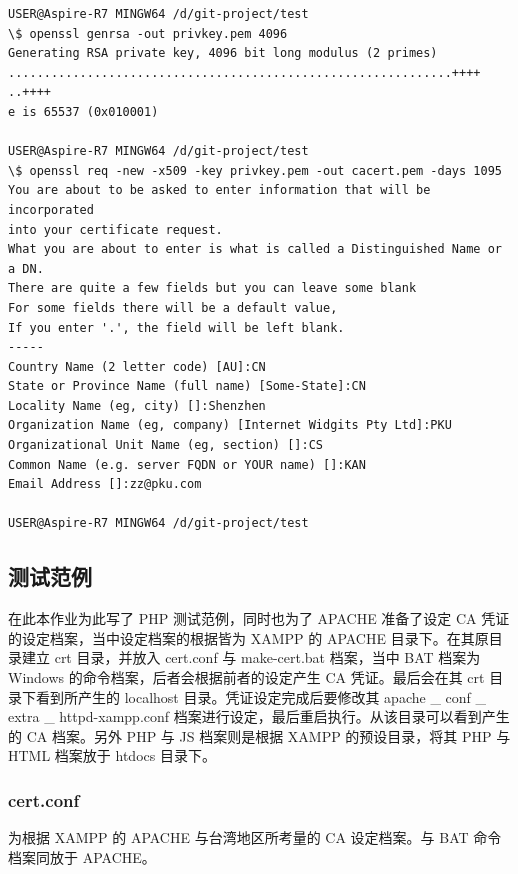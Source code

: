 \begin{Verbatim}
USER@Aspire-R7 MINGW64 /d/git-project/test
\$ openssl genrsa -out privkey.pem 4096
Generating RSA private key, 4096 bit long modulus (2 primes)
..............................................................++++
..++++
e is 65537 (0x010001)

USER@Aspire-R7 MINGW64 /d/git-project/test
\$ openssl req -new -x509 -key privkey.pem -out cacert.pem -days 1095
You are about to be asked to enter information that will be incorporated
into your certificate request.
What you are about to enter is what is called a Distinguished Name or a DN.
There are quite a few fields but you can leave some blank
For some fields there will be a default value,
If you enter '.', the field will be left blank.
-----
Country Name (2 letter code) [AU]:CN
State or Province Name (full name) [Some-State]:CN
Locality Name (eg, city) []:Shenzhen
Organization Name (eg, company) [Internet Widgits Pty Ltd]:PKU
Organizational Unit Name (eg, section) []:CS
Common Name (e.g. server FQDN or YOUR name) []:KAN
Email Address []:zz@pku.com

USER@Aspire-R7 MINGW64 /d/git-project/test
\end{Verbatim}

\subsection{测试范例}

在此本作业为此写了 PHP 测试范例，同时也为了 APACHE 准备了设定 CA 凭证的设定档案，当中设定档案的根据皆为 XAMPP 的 APACHE 目录下。在其原目录建立 crt 目录，并放入 cert.conf 与 make-cert.bat 档案，当中 BAT 档案为 Windows 的命令档案，后者会根据前者的设定产生 CA 凭证。最后会在其 crt 目录下看到所产生的 localhost 目录。凭证设定完成后要修改其 apache \_ conf \_ extra \_ httpd-xampp.conf 档案进行设定，最后重启执行。从该目录可以看到产生的 CA 档案。另外 PHP 与 JS 档案则是根据 XAMPP 的预设目录，将其 PHP 与 HTML 档案放于 htdocs 目录下。

\subsubsection{cert.conf}

为根据 XAMPP 的 APACHE 与台湾地区所考量的 CA 设定档案。与 BAT 命令档案同放于 APACHE。

